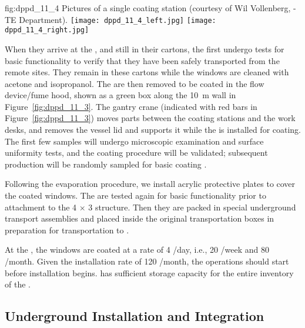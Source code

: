 \begin{dunefigure}{fig:dppd_11_4}
{Pictures of a single  coating station (courtesy of Wil Vollenberg, -TE Department).}
\texttt{[image: dppd\_11\_4\_left.jpg]}
\texttt{[image: dppd\_11\_4\_right.jpg]}
\end{dunefigure}



When they arrive at the , and still in their cartons, the  first undergo tests for basic functionality to verify that they have been safely transported from the remote sites. They remain in these cartons while the windows are cleaned with acetone and isopropanol. The  are then removed to be coated in the flow device/fume hood, shown as a green box along the \SI{10}{\m} wall in Figure~\ref{fig:dppd_11_3}.  The gantry crane (indicated with red bars in Figure~\ref{fig:dppd_11_3}) moves parts between the coating stations and the work desks, %
and removes the vessel lid and supports it while the  is installed for coating.
The first few
samples will undergo microscopic examination and surface uniformity tests, and the
coating procedure will be validated; subsequent production  will be randomly
sampled for basic coating .

Following the evaporation procedure, we install acrylic protective plates to cover the coated  windows.
The  are tested again for basic functionality prior to attachment %
to the \num{4} $\times$ \num{3} structure. Then they are packed in special underground transport
assemblies and placed inside the original transportation boxes in preparation for transportation to .

At the , the  windows are coated at a rate of \num{4} /day, i.e., \num{20} /week and \num{80} /month. Given the installation rate of \num{120} /month, the  operations should start before installation begins.  has sufficient storage capacity for the entire  inventory of the . 

\subsection{Underground Installation and Integration}
\label{subsec:dp-pds-undergroundinstallation}

